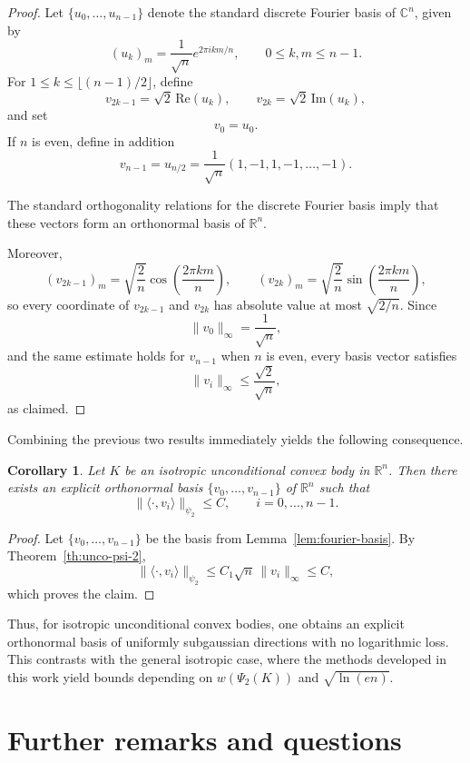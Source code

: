 \documentclass[11pt,leqno]{article}
\newtheorem{corollary}[theorem]{Corollary}
\theoremstyle{definition}
\numberwithin{equation}{section}
\newcommand{\ls}{\leqslant}
\begin{document}
\begin{proof}
Let $\{u_0,\ldots,u_{n-1}\}$ denote the standard discrete Fourier basis of $\mathbb{C}^n$, given by
\[(u_k)_m=\frac1{\sqrt n}e^{2\pi i km/n},\qquad 0\ls k,m\ls n-1.\]
For $1\ls k\ls\lfloor(n-1)/2\rfloor$, define
\[v_{2k-1}=\sqrt2\,\mathrm{Re}(u_k),\qquad v_{2k}=\sqrt2\,\mathrm{Im}(u_k),\]
and set
\[v_0=u_0.\]
If $n$ is even, define in addition
\[v_{n-1}=u_{n/2}=\frac1{\sqrt n}(1,-1,1,-1,\ldots,-1).\]

The standard orthogonality relations for the discrete Fourier basis imply that these vectors form an orthonormal basis of $\mathbb{R}^n$.

Moreover,
\[(v_{2k-1})_m=\sqrt{\frac2n}\cos\!\left(\frac{2\pi km}{n}\right),\qquad (v_{2k})_m=\sqrt{\frac2n}\sin\!\left(\frac{2\pi km}{n}\right),\]
so every coordinate of $v_{2k-1}$ and $v_{2k}$ has absolute value at most $\sqrt{2/n}$. Since
\[\|v_0\|_\infty=\frac1{\sqrt n},\]
and the same estimate holds for $v_{n-1}$ when $n$ is even, every basis vector satisfies
\[\|v_i\|_\infty\ls\frac{\sqrt2}{\sqrt n},\]
as claimed.
\end{proof}

Combining the previous two results immediately yields the following consequence.

\begin{corollary}
Let $K$ be an isotropic unconditional convex body in $\mathbb{R}^n$. Then there exists an explicit orthonormal basis
$\{v_0,\ldots,v_{n-1}\}$ of $\mathbb{R}^n$ such that
\[\|\langle\cdot,v_i\rangle\|_{\psi_2}\ls C,\qquad i=0,\ldots,n-1.\]
\end{corollary}

\begin{proof}
Let $\{v_0,\ldots,v_{n-1}\}$ be the basis from Lemma~\ref{lem:fourier-basis}. By Theorem~\ref{th:unco-psi-2},
\[\|\langle\cdot,v_i\rangle\|_{\psi_2}\ls C_1\sqrt n\,\|v_i\|_\infty\ls C,\]
which proves the claim.
\end{proof}

Thus, for isotropic unconditional convex bodies, one obtains an explicit orthonormal basis of uniformly subgaussian directions with no logarithmic loss. This contrasts with the general isotropic case, where the methods developed in this work yield bounds depending on $w(\Psi_2(K))$ and $\sqrt{\ln(en)}$.

\section{Further remarks and questions}\label{section:4}
\end{document}
